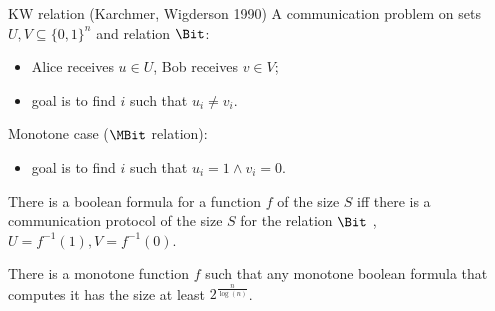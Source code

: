 \begin{frame}{KW relation (Karchmer, Wigderson 1990)}
    A communication problem on sets $U, V \subseteq \{0, 1\}^{n}$ and relation $\Bit$:
    \begin{itemize}
        \item Alice receives $u \in U$, Bob receives $v \in V$;
        \item goal is to find $i$ such that $u_i \neq v_i$.
    \end{itemize}
    \pause
    Monotone case ($\MBit$ relation):
    \begin{itemize}
        \item goal is to find $i$ such that $u_i = 1 \land v_i = 0$.
    \end{itemize}

    \pause

    \begin{theorem}
        There is a  boolean {\color{blue} formula} for a function $f$ of the
        size $S$ iff there is a communication protocol of the size $S$ for the relation $\Bit$
        , $U = f^{-1}(1), V = f^{-1}(0)$.
    \end{theorem}

    \pause
    \pause
    
    \begin{theorem}[Pitassi, G{\"{o}}{\"{o}}s, 2014]
        There is a monotone function $f$ such that any monotone boolean formula that computes it has the
        size at least $2^{\frac{n}{\log(n)}}$. 
    \end{theorem}
\end{frame}


